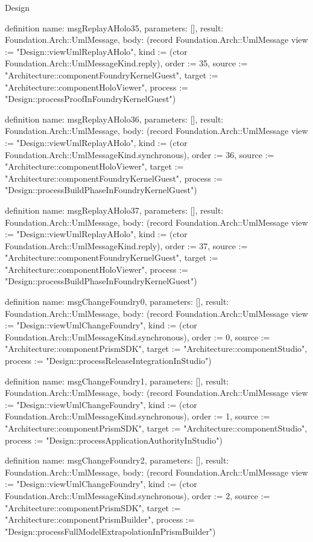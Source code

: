 \begin{lexlean}{Design}
\begin{semanticmodule}
definition{
  name: msgReplayAHolo35,
  parameters: [],
  result: Foundation.Arch::UmlMessage,
  body: (record Foundation.Arch::UmlMessage {view := "Design::viewUmlReplayAHolo", kind := (ctor Foundation.Arch::UmlMessageKind.reply), order := 35, source := "Architecture::componentFoundryKernelGuest", target := "Architecture::componentHoloViewer", process := "Design::processProofInFoundryKernelGuest"})
}

definition{
  name: msgReplayAHolo36,
  parameters: [],
  result: Foundation.Arch::UmlMessage,
  body: (record Foundation.Arch::UmlMessage {view := "Design::viewUmlReplayAHolo", kind := (ctor Foundation.Arch::UmlMessageKind.synchronous), order := 36, source := "Architecture::componentHoloViewer", target := "Architecture::componentFoundryKernelGuest", process := "Design::processBuildPhaseInFoundryKernelGuest"})
}

definition{
  name: msgReplayAHolo37,
  parameters: [],
  result: Foundation.Arch::UmlMessage,
  body: (record Foundation.Arch::UmlMessage {view := "Design::viewUmlReplayAHolo", kind := (ctor Foundation.Arch::UmlMessageKind.reply), order := 37, source := "Architecture::componentFoundryKernelGuest", target := "Architecture::componentHoloViewer", process := "Design::processBuildPhaseInFoundryKernelGuest"})
}

definition{
  name: msgChangeFoundry0,
  parameters: [],
  result: Foundation.Arch::UmlMessage,
  body: (record Foundation.Arch::UmlMessage {view := "Design::viewUmlChangeFoundry", kind := (ctor Foundation.Arch::UmlMessageKind.synchronous), order := 0, source := "Architecture::componentPrismSDK", target := "Architecture::componentStudio", process := "Design::processReleaseIntegrationInStudio"})
}

definition{
  name: msgChangeFoundry1,
  parameters: [],
  result: Foundation.Arch::UmlMessage,
  body: (record Foundation.Arch::UmlMessage {view := "Design::viewUmlChangeFoundry", kind := (ctor Foundation.Arch::UmlMessageKind.synchronous), order := 1, source := "Architecture::componentPrismSDK", target := "Architecture::componentStudio", process := "Design::processApplicationAuthorityInStudio"})
}

definition{
  name: msgChangeFoundry2,
  parameters: [],
  result: Foundation.Arch::UmlMessage,
  body: (record Foundation.Arch::UmlMessage {view := "Design::viewUmlChangeFoundry", kind := (ctor Foundation.Arch::UmlMessageKind.synchronous), order := 2, source := "Architecture::componentPrismSDK", target := "Architecture::componentPrismBuilder", process := "Design::processFullModelExtrapolationInPrismBuilder"})
}


\end{semanticmodule}
\end{lexlean}
